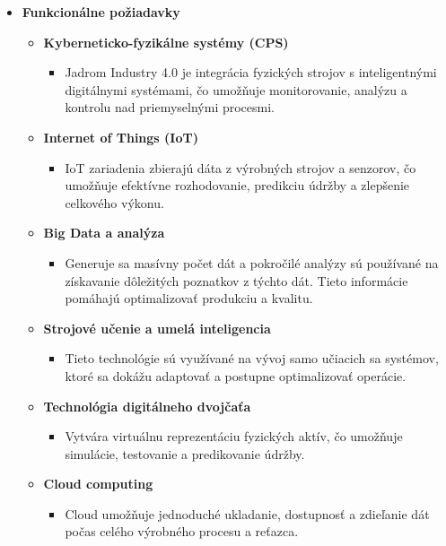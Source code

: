 \begin{itemize}
   \item \textbf{Funkcionálne požiadavky}
   
   \begin{itemize}
     \item \textbf{Kyberneticko-fyzikálne systémy (CPS)}
        \begin{itemize}
            \item Jadrom Industry 4.0 je integrácia fyzických strojov s inteligentnými digitálnymi systémami, čo umožňuje monitorovanie, analýzu a kontrolu nad priemyselnými procesmi.
        \end{itemize}
     \item \textbf{Internet of Things (IoT)}
        \begin{itemize}
            \item IoT zariadenia zbierajú dáta z výrobných strojov a senzorov, čo umožňuje efektívne rozhodovanie, predikciu údržby a zlepšenie celkového výkonu.
        \end{itemize}
     \item \textbf{Big Data a analýza}
        \begin{itemize}
            \item Generuje sa masívny počet dát a pokročilé analýzy sú používané na získavanie dôležitých poznatkov z týchto dát. Tieto informácie pomáhajú optimalizovať produkciu a kvalitu.
        \end{itemize}
     \item \textbf{Strojové učenie a umelá inteligencia}
        \begin{itemize}
            \item Tieto technológie sú využívané na vývoj samo učiacich sa systémov, ktoré sa dokážu adaptovať a postupne optimalizovať operácie.
        \end{itemize}
     \item \textbf{Technológia digitálneho dvojčaťa}
        \begin{itemize}
            \item Vytvára virtuálnu reprezentáciu fyzických aktív, čo umožňuje simulácie, testovanie a predikovanie údržby.
        \end{itemize}
     \item \textbf{Cloud computing}
        \begin{itemize}
            \item Cloud umožňuje jednoduché ukladanie, dostupnosť a zdieľanie dát počas celého výrobného procesu a reťazca.

\end{itemize}
\end{itemize}
\end{itemize}
